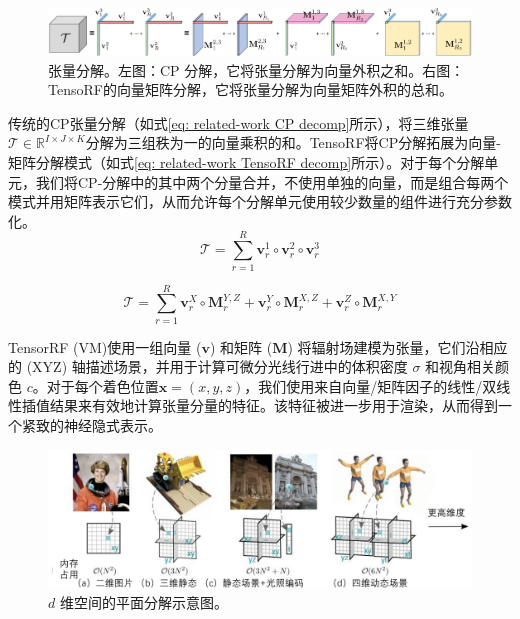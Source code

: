 \begin{figure}[h]
    \centering
    \includegraphics[width=\textwidth]{undergraduate-thesis/images/related-work/Tensor Decomp.png}
    \caption{张量分解\cite{chen_tensorf_2022}。左图：CP 分解，它将张量分解为向量外积之和。右图：TensoRF的向量矩阵分解，它将张量分解为向量矩阵外积的总和。}
    \label{fig:related-work tensor-decomp}
\end{figure}

传统的CP张量分解（如式\ref{eq: related-work CP decomp}所示），将三维张量$\mathcal{T}\in\mathbb{R}^{I\times J\times K}$分解为三组秩为一的向量乘积的和。TensoRF将CP分解拓展为向量-矩阵分解模式（如式\ref{eq: related-work TensoRF decomp}所示）。对于每个分解单元，我们将CP-分解中的其中两个分量合并，不使用单独的向量，而是组合每两个模式并用矩阵表示它们，从而允许每个分解单元使用较少数量的组件进行充分参数化。
\begin{equation}
    \mathcal{T} = \sum_{r=1}^R\mathbf{v}_r^1\circ\mathbf{v}_r^2\circ\mathbf{v}_r^3
    \label{eq: related-work CP decomp}
\end{equation}

\begin{equation}
    \mathcal{T} = \sum_{r=1}^R\mathbf{v}_r^X\circ\mathbf{M}_r^{Y,Z}+\mathbf{v}_r^Y\circ\mathbf{M}_r^{X,Z}+\mathbf{v}_r^Z\circ\mathbf{M}_r^{X,Y}
    \label{eq: related-work TensoRF decomp}
\end{equation}

TensorRF (VM)使用一组向量 ($\mathbf{v}$) 和矩阵 ($\mathbf{M}$) 将辐射场建模为张量，它们沿相应的 (XYZ) 轴描述场景，并用于计算可微分光线行进中的体积密度 $\sigma$ 和视角相关颜色 $c$。对于每个着色位置$ \mathbf{x} = (x, y, z)$，我们使用来自向量/矩阵因子的线性/双线性插值结果来有效地计算张量分量的特征。该特征被进一步用于渲染，从而得到一个紧致的神经隐式表示。

\begin{figure}[ht]
    \centering
    \includegraphics[width=\textwidth]{undergraduate-thesis/images/related-work/kplanes-teaser.pdf}
    \caption{$d$ 维空间的平面分解示意图\cite{fridovich-keil_k-planes_2023}。}
    \label{fig:related-work kplane-teaser}
\end{figure}


